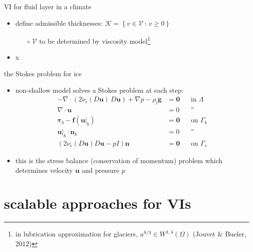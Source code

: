 \documentclass[svgnames,
               hyperref={colorlinks,citecolor=DeepPink4,linkcolor=FireBrick,urlcolor=Maroon},
               usepdftitle=false]  %
               {beamer}
\newcommand{\eps}{\epsilon}
\newcommand{\bbf}{\mathbf{f}}
\newcommand{\bn}{\mathbf{n}}
\newcommand{\bu}{\mathbf{u}}
\newcommand{\btau}{\bm{\tau}}
\newcommand{\bzero}{\bm{0}}
\newcommand{\rhoi}{\rho_{\text{i}}}
\begin{document}
\begin{frame}{VI for fluid layer in a climate}

\begin{itemize}
\item define admissible thicknesses: $\mathcal{K} = \left\{v \in \mathcal{V} \,:\, v \ge 0\right\}$

    \begin{itemize}
    \item[$\circ$] $\mathcal{V}$ to be determined by viscosity model\footnote{in lubrication approximation for glaciers, $u^{8/3} \in W^{1,4}(\Omega)$ (Jouvet \& Bueler, 2012)}
    \end{itemize}
\item x
\end{itemize}
\end{frame}


\begin{frame}{the Stokes problem for ice}

\begin{itemize}
\item non-shallow model solves a Stokes problem at each step:
\begin{align*}
- \nabla \cdot \left(2 \nu_\eps(D\bu)\, D\bu\right) + \nabla p - \rhoi \mathbf{g} &= \bzero && \text{in $\Lambda$} \\
\nabla \cdot \bu &= 0 && \text{''} \\
\btau_b - \bbf(\bu|_b) &= \bzero && \text{on $\Gamma_b$} \\
\bu|_b \cdot \bn_b &= 0 && \text{''} \\
\left(2 \nu_\eps(D\bu) D\bu - pI\right) \bn &= \bzero && \text{on $\Gamma_s$}
\end{align*}
\item this is the \alert{stress balance} (conservation of momentum) problem which determines velocity $\bu$ and pressure $p$
\end{itemize}
\end{frame}


\section{scalable approaches for VIs}
\end{document}
